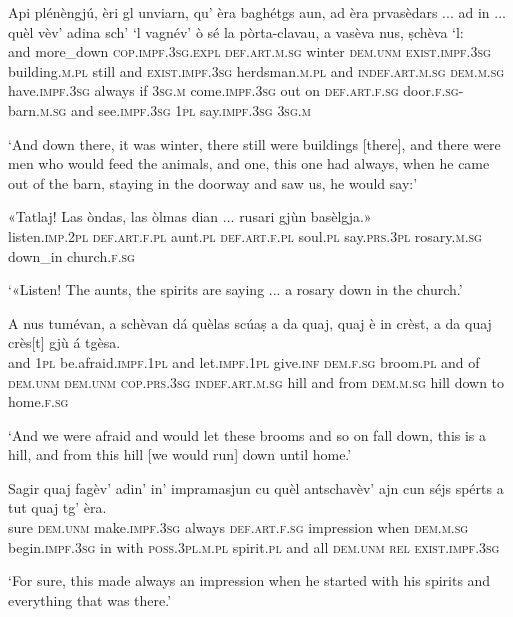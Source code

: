 \begin{linenumbers}
\gll    Api plénèngjú, èri gl unviarn, qu’ èra baghétgs aun, ad èra prvasèdars ... ad in ... quèl vèv’ adina sch’ `l vagnév’ ò sé la pòrta-clavau, a vasèva nus, ṣchèva `l: \\
  and more\_down \textsc{cop.impf.3sg.expl} \textsc{def.art.m.sg} winter \textsc{dem.unm} \textsc{exist.impf.3sg} building.\textsc{m.pl} still and \textsc{exist.impf.3sg} herdsman.\textsc{m.pl} {} and \textsc{indef.art.m.sg} {} \textsc{dem.m.sg} have.\textsc{impf.3sg} always if \textsc{3sg.m} come.\textsc{impf.3sg} out on \textsc{def.art.f.sg} door.\textsc{f.sg}-barn.\textsc{m.sg} and see.\textsc{impf.3sg} \textsc{1pl} say.\textsc{impf.3sg} \textsc{3sg.m} \\
\end{linenumbers}
\medskip
\glt `And down there, it was winter, there still were buildings [there], and there were men who would feed the animals, and one, this one had always, when he came out of the barn, staying in the doorway and saw us, he would say:'
\medskip

\begin{linenumbers}
\gll «Tatlaj! Las òndas, las òlmas dian ... rusari gjùn basèlgja.»  \\
     listen.\textsc{imp.2pl} \textsc{def.art.f.pl} aunt.\textsc{pl} \textsc{def.art.f.pl} soul.\textsc{pl} say.\textsc{prs.3pl} {} rosary.\textsc{m.sg} down\_in church.\textsc{f.sg}\\
\end{linenumbers}
\medskip
\glt `«Listen! The aunts, the spirits are saying ... a rosary down in the church.'
\medskip

\begin{linenumbers}
\gll A nus tumévan, a schèvan dá quèlas scúaṣ a da quaj, quaj è in crèst, a da quaj crès[t] gjù á tgèsa.\\
  and \textsc{1pl} be.afraid.\textsc{impf.1pl} and let.\textsc{impf.1pl} give.\textsc{inf} \textsc{dem.f.sg} broom.\textsc{pl} and of \textsc{dem.unm} \textsc{dem.unm} \textsc{cop.prs.3sg} \textsc{indef.art.m.sg} hill and from \textsc{dem.m.sg} hill down to home.\textsc{f.sg}\\
\end{linenumbers}
\medskip
\glt `And we were afraid and would let these brooms and so on fall down, this is a hill, and from this hill [we would run] down until home.'
\medskip

\begin{linenumbers}
\gll  Sagir quaj fagèv’ adin’ in’ impramasjun\footnotemark{} cu quèl antschavèv’ ajn cun séjs spérts a tut quaj tg’ èra.  \\
sure \textsc{dem.unm} make.\textsc{impf.3sg} always \textsc{def.art.f.sg} impression when \textsc{dem.m.sg} begin.\textsc{impf.3sg} in with \textsc{poss.3pl.m.pl} spirit.\textsc{pl}  and all \textsc{dem.unm} \textsc{rel} \textsc{exist.impf.3sg}  \\
\end{linenumbers}
\medskip
\glt `For sure, this made always an impression when he started with his spirits and everything that was there.'
\medskip

